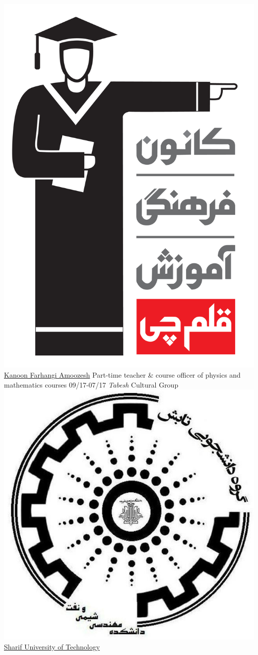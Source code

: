 \documentclass[a4paper]{friggeri-cv}
\begin{document}
\begin{entrylist}
    {\href{http://www.kanoon.ir/}{\includegraphics[scale=0.005]{../assets/images/Kanoon_logo.png} Kanoon Farhangi Amoozesh}}
    {Part-time teacher \& course officer of physics and mathematics courses}
  \entry
    {09/17-07/17}
    {   \emph{Tabesh} Cultural Group}
    {\href{http://www.sharif.ir}{\includegraphics[scale=0.03]{../assets/images/Tabesh_logo.jpg} Sharif University of Technology}}

\end{entrylist}
\end{document}
